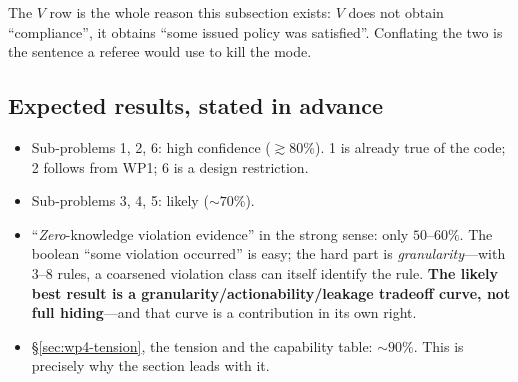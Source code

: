 \documentclass[journal]{IEEEtran}
\newcommand{\need}[1]{}
\newcommand{\need}[1]{\textcolor{blue}{[[ NEED: #1 ]]}}
\begin{document}
The $V$ row is the whole reason this subsection exists: $V$ does not obtain
``compliance'', it obtains ``some issued policy was satisfied''. Conflating the
two is the sentence a referee would use to kill the mode.

\need{Remaining work on this subsection: (a) confirm the (P-PP) framing with
the collaborator, and choose its instantiation (an on-chain registry of issued
policy hashes vs.\ a signed manifest); (b) add the prior-art citations below;
(c) decide whether the capability table merges with Table~\ref{tab:wp4} in the
submission, or stays separate (currently separate, on the grounds that one
table is about leakage and the other about verifier conclusions).}

\subsection{Expected results, stated in advance}
\label{sec:wp4-expect}

\need{Calibrated expectations, so that a partial outcome is a publishable
result rather than a failure:}
\begin{itemize}
  \item Sub-problems 1, 2, 6: high confidence ($\gtrsim 80\%$). 1 is already
        true of the code; 2 follows from WP1; 6 is a design restriction.
  \item Sub-problems 3, 4, 5: likely ($\sim 70\%$).
  \item ``\emph{Zero}-knowledge violation evidence'' in the strong sense:
        only $50$--$60\%$. The boolean ``some violation occurred'' is easy; the
        hard part is \emph{granularity}---with $3$--$8$ rules, a coarsened
        violation class can itself identify the rule. \textbf{The likely best
        result is a granularity/actionability/leakage tradeoff curve, not full
        hiding}---and that curve is a contribution in its own right.
  \item \S\ref{sec:wp4-tension}, the tension and the capability table:
        $\sim 90\%$. This is precisely why the section leads with it.
\end{itemize}

\need{Prior-art discipline, and this is the highest-risk place in the paper ---
the collaborator's own field. \emph{Policy hiding is not a new primitive}:
hidden credentials, secret handshake, and XACML privacy in access control, and
attribute-hiding / fuzzy predicate encryption, are all the same family. Cite
that line explicitly and do not claim primacy. What is new is narrow: (a) the
\emph{application} to LLM output compliance together with selective disclosure
of violation type and location, and (b) the accountability tension of
\S\ref{sec:wp4-tension}.}
\end{document}
